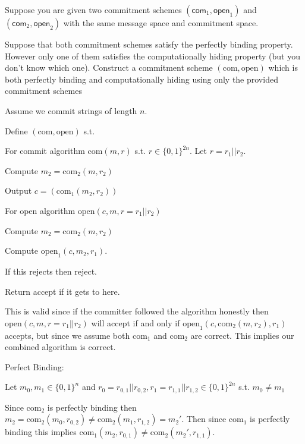 \documentclass[12pt, letterpaper]{article}
\newcommand{\bit}{{\{0,1\}}}
\newcommand{\com}{\mathrm{com}}
\begin{document}
\begin{problem}{}
    Suppose you are given two commitment schemes $(\mathsf{com}_1, \mathsf{open}_1)$ and $(\mathsf{com}_2, \mathsf{open}_2)$ with the same message space and commitment space.
\end{problem}
\begin{subproblem}{}
    Suppose that both commitment schemes satisfy the perfectly binding property. However only one of them satisfies the computationally hiding property (but you don't
know which one). Construct a commitment scheme $(\mathrm{com}, \mathrm{open})$ which is both perfectly
binding and computationally hiding using only the provided commitment schemes
\end{subproblem}
\begin{problemproof}
    Assume we commit strings of length $n$.

    Define $(\mathrm{com}, \mathrm{open})$ s.t.

    For commit algorithm $\mathrm{com}(m,r)$ s.t. $r \in \{0,1\}^{2n}$. Let $r=r_1||r_2$.

    Compute $m_2 = \mathrm{com}_2(m,r_2)$

    Output $c=(\mathrm{com}_1(m_2,r_2))$
    
    \phantom{text}

    For open algorithm $\mathrm{open}(c,m,r=r_1||r_2)$
    
    Compute $m_2 =\com_2(m,r_2)$
    
    Compute $\mathrm{open}_1(c,m_2,r_1)$.

    If this rejects then reject.

    Return accept if it gets to here.

    \phantom{text}

    This is valid since if the committer followed the algorithm honestly then $\mathrm{open}(c,m,r=r_1||r_2)$ will accept if and only if $\mathrm{open}_1(c,\com_2(m,r_2),r_1)$ accepts, but since we assume both $\com_1$  and $\com_2$ are correct. This implies our combined algorithm is correct.

    Perfect Binding:

    Let $m_0,m_1 \in \bit^n$ and $r_0=r_{0,1}||r_{0,2},r_1=r_{1,1}||r_{1,2} \in \bit^{2n}$ s.t. $m_0 \neq m_1$

    Since $\com_2$ is perfectly binding then $m_2=\com_2(m_0,r_{0,2}) \neq \com_2(m_1,r_{1,2})=m_2'$. Then since $\com_1$ is perfectly binding this implies $\com_1(m_2,r_{0,1}) \neq \com_2(m_2',r_{1,1})$.


\end{problemproof}
\end{document}
